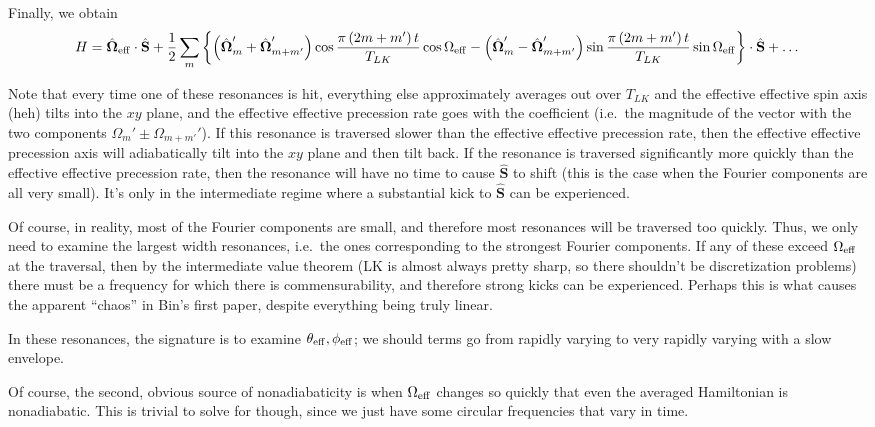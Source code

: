 \documentclass[11pt,
        usenames, %
        dvipsnames %
    ]{article}
\newcommand*{\bm}[1]{\boldsymbol{\mathbf{#1}}}
\newcommand*{\uv}[1]{\hat{\bm{#1}}}
\newcommand*{\p}[1]{\left(#1\right)}
\newcommand*{\z}[1]{\left\{#1\right\}}
\begin{document}
Finally, we obtain
\begin{equation}
    H = \uv{\Omega}_{\rm eff} \cdot \uv{S}
        + \frac{1}{2}\sum\limits_m \z{ \p{\uv{\Omega}_{m}' + \uv{\Omega}_{m +
            m'}'} \cos \frac{\pi \p{2m + m'}t}{T_{LK}}\cos \Omega_{\rm eff}
            - \p{\uv{\Omega}_{m}' - \uv{\Omega}_{m +
            m'}'} \sin \frac{\pi \p{2m + m'}t}{T_{LK}}\sin \Omega_{\rm eff}}
            \cdot \uv{S}
        + \dots
\end{equation}

Note that every time one of these resonances is hit, everything else
approximately averages out over $T_{LK}$ and the effective effective spin axis
(heh) tilts into the $xy$ plane, and the effective effective precession rate
goes with the coefficient (i.e.\ the magnitude of the vector with the two
components $\Omega_{m}' \pm \Omega_{m + m'}'$). If this resonance is traversed
slower than the effective effective precession rate, then the effective
effective precession axis will adiabatically tilt into the $xy$ plane and then
tilt back. If the resonance is traversed significantly more quickly than the
effective effective precession rate, then the resonance will have no time to
cause $\uv{S}$ to shift (this is the case when the Fourier components are all
very small). It's only in the intermediate regime where a substantial
kick to $\uv{S}$ can be experienced.

Of course, in reality, most of the Fourier components are small, and therefore
most resonances will be traversed too quickly. Thus, we only need to examine the
largest width resonances, i.e.\ the ones corresponding to the strongest Fourier
components. If any of these exceed $\Omega_{\rm eff}$ at the traversal, then by
the intermediate value theorem (LK is almost always pretty sharp, so there
shouldn't be discretization problems) there must be a frequency for which there
is commensurability, and therefore strong kicks can be experienced. Perhaps this
is what causes the apparent ``chaos'' in Bin's first paper, despite everything
being truly linear.

In these resonances, the signature is to examine $\theta_{\rm eff}, \phi_{\rm
eff}$; we should terms go from rapidly varying to very rapidly varying with a
slow envelope.

Of course, the second, obvious source of nonadiabaticity is when $\Omega_{\rm
eff}$ changes so quickly that even the averaged Hamiltonian is nonadiabatic.
This is trivial to solve for though, since we just have some circular
frequencies that vary in time.
\end{document}
